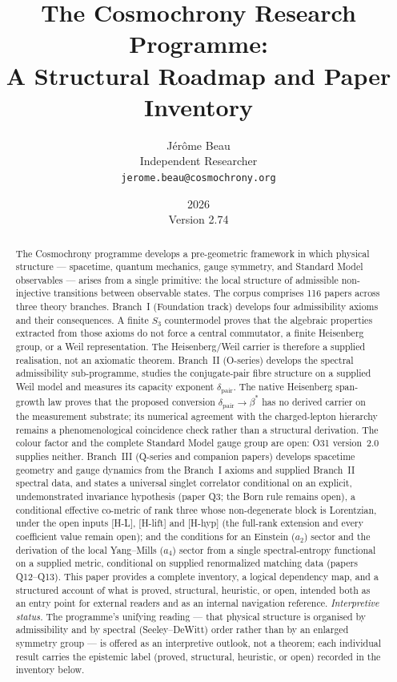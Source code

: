 \documentclass[11pt,a4paper]{article}
\title{The Cosmochrony Research Programme:\\[4pt]
A Structural Roadmap and Paper Inventory}
\author{J\'er\^ome Beau\\[4pt]
\small Independent Researcher\\
\small \texttt{jerome.beau@cosmochrony.org}}
\date{2026\\[2pt]\small Version 2.74}
\begin{document}
  \maketitle

  \begin{abstract}
    The Cosmochrony programme develops a pre-geometric framework in which physical structure ---
    spacetime, quantum mechanics, gauge symmetry, and Standard Model observables --- arises from
    a single primitive: the local structure of admissible non-injective transitions between
    observable states.
    The corpus comprises 116 papers across three theory branches.
    Branch~I (Foundation track) develops four admissibility axioms and their consequences.
    A finite \(S_3\) countermodel proves that the algebraic properties extracted from those
    axioms do not force a central commutator,
    a finite Heisenberg group, or a Weil representation.
    The Heisenberg/Weil carrier is therefore a supplied realisation, not an axiomatic theorem.
    Branch~II (O-series) develops the spectral admissibility sub-programme, studies the
    conjugate-pair fibre structure on a supplied Weil model and measures its capacity exponent
    $\delta_{\mathrm{pair}}$.
    The native Heisenberg span-growth law proves that the proposed conversion
    $\delta_{\mathrm{pair}} \to \beta^*$ has no derived carrier on the measurement substrate;
    its numerical agreement with the charged-lepton hierarchy remains a phenomenological
    coincidence check rather than a structural derivation.
    The colour factor and the complete Standard Model gauge group are open: O31 version~2.0 supplies
    neither.
    Branch~III (Q-series and companion papers) develops spacetime geometry and gauge dynamics
    from the Branch~I axioms and supplied Branch~II spectral data, and states a universal singlet
    correlator conditional on an explicit, undemonstrated invariance hypothesis (paper Q3; the
    Born rule remains open), a conditional effective co-metric of rank three whose non-degenerate block is
    Lorentzian, under the open inputs [H-L], [H-lift] and [H-hyp] (the full-rank extension and every coefficient
    value remain open); and the
    conditions for an Einstein ($a_2$) sector and the derivation of the local Yang--Mills ($a_4$) sector from a
    single spectral-entropy functional on a supplied metric, conditional on supplied renormalized matching data
    (papers Q12--Q13).
    This paper provides a complete inventory, a logical dependency map, and a structured account
    of what is proved, structural, heuristic, or open, intended both as an entry point for
    external readers and as an internal navigation reference.
    \emph{Interpretive status.} The programme's unifying reading --- that physical structure is
    organised by admissibility and by spectral (Seeley--DeWitt) order rather than by an enlarged
    symmetry group --- is offered as an interpretive outlook, not a theorem; each individual
    result carries the epistemic label (proved, structural, heuristic, or open) recorded in the
    inventory below.
  \end{abstract}
\end{document}
